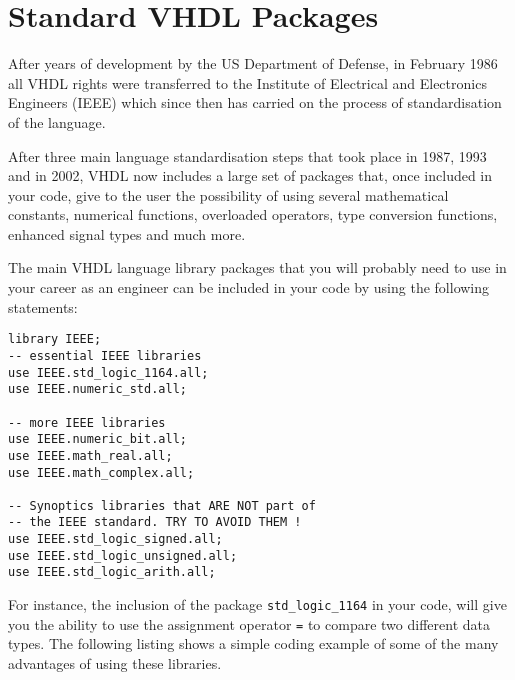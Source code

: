 \null\newpage
\thispagestyle{empty}
\mbox{}

\chapter{Standard VHDL Packages}
After years of development by the US Department of Defense, in February 1986 all VHDL rights were transferred to the Institute of Electrical and Electronics Engineers (IEEE) which since then has carried on the process of standardisation of the language. 

After three main language standardisation steps that took place in 1987, 1993 and in 2002, VHDL now includes a large set of packages that, once included in your code, give to the user the possibility of using several mathematical constants, numerical functions, overloaded operators, type conversion functions, enhanced signal types and much more.

The main VHDL language library packages that you will probably need to use in your career as an engineer can be included in your code by using the following statements:

\begin{verbatim}
library IEEE;
-- essential IEEE libraries
use IEEE.std_logic_1164.all;
use IEEE.numeric_std.all;

-- more IEEE libraries
use IEEE.numeric_bit.all;
use IEEE.math_real.all;
use IEEE.math_complex.all;

-- Synoptics libraries that ARE NOT part of 
-- the IEEE standard. TRY TO AVOID THEM !
use IEEE.std_logic_signed.all;
use IEEE.std_logic_unsigned.all;
use IEEE.std_logic_arith.all;

\end{verbatim}

For instance, the inclusion of the package \texttt{std\_logic\_1164} in your code, will give you the ability to use the assignment operator \texttt{=} to compare two different data types. The following listing shows a simple coding example of some of the many advantages of using these libraries.

